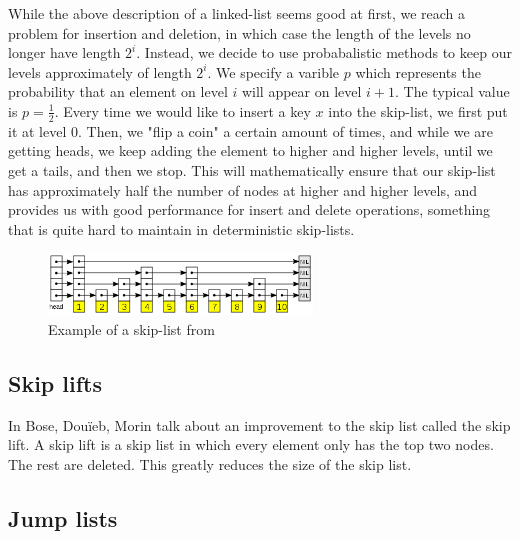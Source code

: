 \documentclass[oribibl]{llncs}
\begin{document}
While the above description of a linked-list seems good at first, we reach a problem for insertion and deletion, in which case the length of the levels no longer have length $2^i$. Instead, we decide to use probabalistic methods to keep our levels approximately of length $2^i$. We specify a varible $p$ which represents the probability that an element on level $i$ will appear on level $i+1$. The typical value is $p=\frac{1}{2}$. Every time we would like to insert a key $x$ into the skip-list, we first put it at level 0. Then, we "flip a coin" a certain amount of times, and while we are getting heads, we keep adding the element to higher and higher levels, until we get a tails, and then we stop. This will mathematically ensure that our skip-list has approximately half the number of nodes at higher and higher levels, and provides us with good performance for insert and delete operations, something that is quite hard to maintain in deterministic skip-lists.

\begin{figure}[here]
\center
\includegraphics[width=7cm]{skip_list}
\caption{Example of a skip-list from \cite{skip_list}}
\label{fig:skip_list}
\end{figure}

\subsection{Skip lifts}

In \cite{skip_lift} Bose, Douïeb, Morin talk about an improvement to the skip list called the skip lift. A skip lift is a skip list in which every element only has the top two nodes. The rest are deleted. This greatly reduces the size of the skip list.

\subsection{Jump lists}
\end{document}
